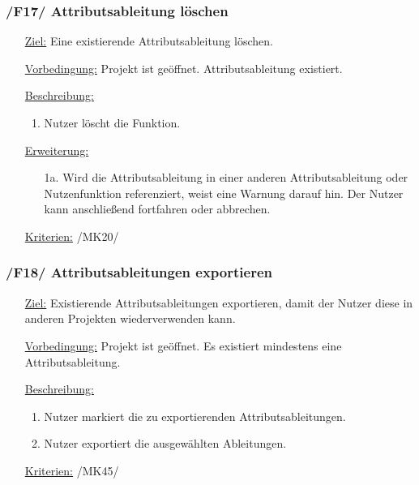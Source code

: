 \documentclass{article}
\begin{document}
\subsubsection*{\textbf{/F17/} Attributsableitung löschen} \label{sec:f:Attributsableitung löschen}
\begin{itemize}
    \item[\underline{Ziel:}] Eine existierende Attributsableitung löschen.
    \item[\underline{Vorbedingung:}] Projekt ist geöffnet. Attributsableitung existiert.
    \item[\underline{Beschreibung:}]
    \begin{enumerate}
        \item Nutzer löscht die Funktion.
    \end{enumerate}
    \item[\underline{Erweiterung:}]
    \begin{itemize}
        \item[1a.] Wird die Attributsableitung in einer anderen Attributsableitung oder Nutzenfunktion referenziert, weist eine Warnung darauf hin. Der Nutzer kann anschließend fortfahren oder abbrechen.
    \end{itemize}
    \item[\underline{Kriterien:}] /MK20/
\end{itemize}

\subsubsection*{\textbf{/F18/} Attributsableitungen exportieren} \label{sec:f:Attributsableitungen exportieren}
\begin{itemize}
    \item[\underline{Ziel:}] Existierende Attributsableitungen exportieren, damit der Nutzer diese in anderen Projekten wiederverwenden kann.
    \item[\underline{Vorbedingung:}] Projekt ist geöffnet. Es existiert mindestens eine Attributsableitung.
    \item[\underline{Beschreibung:}]
    \begin{enumerate}
        \item Nutzer markiert die zu exportierenden Attributsableitungen.
        \item Nutzer exportiert die ausgewählten Ableitungen. 
    \end{enumerate}
    \item[\underline{Kriterien:}] /MK45/
\end{itemize}
\end{document}
